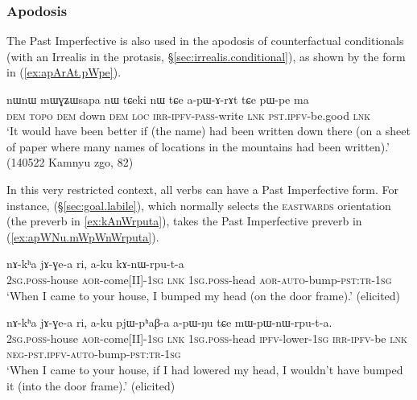 \subsubsection{Apodosis} \label{sec:pst.ifr.ipfv.apodosis}
The Past Imperfective is also used in the apodosis of counterfactual conditionals (with an Irrealis in the protasis, §\ref{sec:irrealis.conditional}), as shown by the form  in (\ref{ex:apArAt.pWpe}).

\begin{exe}
\ex \label{ex:apArAt.pWpe}
\gll nɯnɯ mɯɣʑɯsapa nɯ tɕeki nɯ tɕe a-pɯ-ɤ-rɤt tɕe pɯ-pe ma \\ 
\textsc{dem}  \textsc{topo} \textsc{dem} down \textsc{dem} \textsc{loc} \textsc{irr}-\textsc{ipfv}-\textsc{pass}-write \textsc{lnk} \textsc{pst}.\textsc{ipfv}-be.good \textsc{lnk} \\
\glt `It would have been better if (the name)  had been written down there (on a sheet of paper where many names of locations in the mountains had been written).' (140522  Kamnyu zgo, 82)
\end{exe}

In this very restricted context, all verbs can have a Past Imperfective form. For instance,  (§\ref{sec:goal.labile}), which normally selects the \textsc{eastwards} orientation (the preverb  in \ref{ex:kAnWrputa}), takes the  Past Imperfective preverb in (\ref{ex:apWNu.mWpWnWrputa}).

\begin{exe}
\ex \label{ex:kAnWrputa}
\gll nɤ-kʰa jɤ-ɣe-a ri, a-ku kɤ-nɯ-rpu-t-a \\
\textsc{2sg}.\textsc{poss}-house \textsc{aor}-come[II]-\textsc{1sg} \textsc{lnk} \textsc{1sg}.\textsc{poss}-head \textsc{aor}-\textsc{auto}-bump-\textsc{pst}:\textsc{tr}-\textsc{1sg} \\
\glt `When I came to your house, I bumped my head (on the door frame).' (elicited)
\end{exe}

\begin{exe}
\ex \label{ex:apWNu.mWpWnWrputa}
\gll nɤ-kʰa jɤ-ɣe-a ri, a-ku pjɯ-pʰaβ-a a-pɯ-ŋu tɕe mɯ-pɯ-nɯ-rpu-t-a. \\
\textsc{2sg}.\textsc{poss}-house \textsc{aor}-come[II]-\textsc{1sg} \textsc{lnk} \textsc{1sg}.\textsc{poss}-head \textsc{ipfv}-lower-\textsc{1sg} \textsc{irr}-\textsc{ipfv}-be \textsc{lnk} \textsc{neg}-\textsc{pst}.\textsc{ipfv}-\textsc{auto}-bump-\textsc{pst}:\textsc{tr}-\textsc{1sg} \\
\glt `When I came to your house, if I had lowered my head, I wouldn't have bumped it (into the door frame).' (elicited)
\end{exe}

